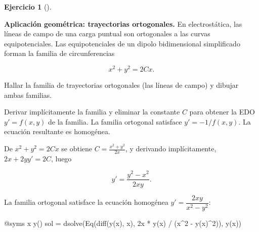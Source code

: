 \documentclass[
  spanish,
  a4paper,
]{scrreport}
\newenvironment{Shaded}{\begin{snugshade}}{\end{snugshade}}
\newcommand{\FloatTok}[1]{\textcolor[rgb]{0.68,0.00,0.00}{#1}}
\newcommand{\FunctionTok}[1]{\textcolor[rgb]{0.28,0.35,0.67}{#1}}
\newcommand{\NormalTok}[1]{\textcolor[rgb]{0.00,0.23,0.31}{#1}}
\newcommand{\OperatorTok}[1]{\textcolor[rgb]{0.37,0.37,0.37}{#1}}
\newcommand{\PreprocessorTok}[1]{\textcolor[rgb]{0.68,0.00,0.00}{#1}}
\theoremstyle{definition}
\newtheorem{exercise}{Ejercicio}[chapter]
\theoremstyle{remark}
\begin{document}
\begin{exercise}[]\protect\hypertarget{exr-trayectorias-ortogonales}{}\label{exr-trayectorias-ortogonales}

\textbf{Aplicación geométrica: trayectorias ortogonales.} En
electrostática, las líneas de campo de una carga puntual son ortogonales
a las curvas equipotenciales. Las equipotenciales de un dipolo
bidimensional simplificado forman la familia de circunferencias

\[
x^2 + y^2 = 2Cx.
\]

Hallar la familia de trayectorias ortogonales (las líneas de campo) y
dibujar ambas familias.

\begin{tcolorbox}[enhanced jigsaw, arc=.35mm, bottomrule=.15mm, bottomtitle=1mm, breakable, colback=white, colbacktitle=quarto-callout-note-color!10!white, colframe=quarto-callout-note-color-frame, coltitle=black, left=2mm, leftrule=.75mm, opacityback=0, opacitybacktitle=0.6, rightrule=.15mm, title=\textcolor{quarto-callout-note-color}{\faInfo}\hspace{0.5em}{Ayuda}, titlerule=0mm, toprule=.15mm, toptitle=1mm]

Derivar implícitamente la familia y eliminar la constante \(C\) para
obtener la EDO \(y' = f(x,y)\) de la familia. La familia ortogonal
satisface \(y' = -1/f(x,y)\). La ecuación resultante es homogénea.

\end{tcolorbox}

\begin{tcolorbox}[enhanced jigsaw, arc=.35mm, bottomrule=.15mm, bottomtitle=1mm, breakable, colback=white, colbacktitle=quarto-callout-tip-color!10!white, colframe=quarto-callout-tip-color-frame, coltitle=black, left=2mm, leftrule=.75mm, opacityback=0, opacitybacktitle=0.6, rightrule=.15mm, title=\textcolor{quarto-callout-tip-color}{\faLightbulb}\hspace{0.5em}{Solución}, titlerule=0mm, toprule=.15mm, toptitle=1mm]

De \(x^2+y^2 = 2Cx\) se obtiene \(C = \frac{x^2+y^2}{2x}\), y derivando
implícitamente, \(2x + 2yy' = 2C\), luego

\[
y' = \frac{y^2 - x^2}{2xy}.
\]

La familia ortogonal satisface la ecuación homogénea
\(y' = \dfrac{2xy}{x^2 - y^2}\):

\begin{Shaded}
\begin{Highlighting}[]
\PreprocessorTok{@syms}\NormalTok{ x }\FunctionTok{y}\NormalTok{()}
\NormalTok{sol }\OperatorTok{=} \FunctionTok{dsolve}\NormalTok{(}\FunctionTok{Eq}\NormalTok{(}\FunctionTok{diff}\NormalTok{(}\FunctionTok{y}\NormalTok{(x), x), }\FloatTok{2}\NormalTok{x }\OperatorTok{*} \FunctionTok{y}\NormalTok{(x) }\OperatorTok{/}\NormalTok{ (x}\OperatorTok{\^{}}\FloatTok{2} \OperatorTok{{-}} \FunctionTok{y}\NormalTok{(x)}\OperatorTok{\^{}}\FloatTok{2}\NormalTok{)), }\FunctionTok{y}\NormalTok{(x))}
\end{Highlighting}
\end{Shaded}


\end{tcolorbox}
\end{exercise}
\end{document}
